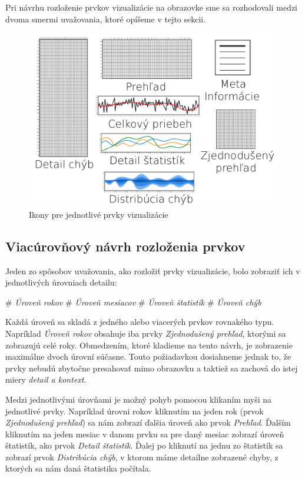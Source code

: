 Pri návrhu rozloženie prvkov vizualizácie na obrazovke sme sa rozhodovali medzi dvoma smermi uvažovania, ktoré opíšeme v tejto sekcii. 

\begin{figure}
	\centering
	\includegraphics[width = 4.5in]{designicons}
	\caption{Ikony pre jednotlivé prvky vizualizácie}
	\label{fig:designicons}
\end{figure}


\subsection{Viacúrovňový návrh rozloženia prvkov}
Jeden zo spôsobov uvažovania, ako rozložiť prvky vizualizácie, bolo zobraziť ich v jednotlivých úrovniach detailu: 
\begin{easylist}
	# \textit{Úroveň rokov}
	# \textit{Úroveň mesiacov}
	# \textit{Úroveň štatistík}
	# \textit{Úroveň chýb} 
\end{easylist}
Každá úroveň sa skladá z jedného alebo viacerých prvkov rovnakého typu. Napríklad \textit{Úroveň rokov} obsahuje iba prvky \textit{Zjednodušený prehľad}, ktorými sa zobrazujú celé roky. Obmedzením, ktoré kladieme na tento návrh, je zobrazenie maximálne dvoch úrovní súčasne. Touto požiadavkou dosiahneme jednak to, že prvky nebudú zbytočne presahovať mimo obrazovku a taktiež sa zachová do istej miery \textit{detail a kontext}. 

Medzi jednotlivými úrovňami je možný pohyb pomocou klikaním myši na jednotlivé prvky. Napríklad úrovni rokov kliknutím na jeden rok (prvok \textit{Zjednodušený prehľad}) sa nám zobrazí ďalšia úroveň ako prvok \textit{Prehľad}. Ďalším kliknutím na jeden mesiac v danom prvku sa pre daný mesiac zobrazí úroveň štatistík, ako prvok \textit{Detail štatistík}. Ďalej po kliknutí na jednu zo štatistík sa zobrazí prvok \textit{Distribúcia chýb}, v ktorom máme detailne zobrazené chyby, z ktorých sa nám daná štatistika počítala.

